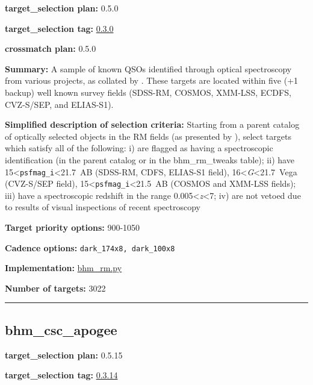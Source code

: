 \noindent\textbf{target\_selection plan:} 0.5.0

\noindent\textbf{target\_selection tag:}
\href{https://github.com/sdss/target_selection/tree/0.3.0/}{0.3.0}

\noindent\textbf{crossmatch plan:} 0.5.0

\noindent\textbf{Summary:} A sample of known QSOs identified through optical
spectroscopy from various projects, as collated by
\citet{Yang2022}. These targets are located within five (+1 backup) well
known survey fields (SDSS-RM, COSMOS, XMM-LSS, ECDFS, CVZ-S/SEP, and
ELIAS-S1).

\noindent\textbf{Simplified description of selection criteria:} Starting from a
parent catalog of optically selected objects in the RM fields (as
presented by
\citealt{Yang2022}), select targets which satisfy all of the following: i)
are flagged as having a spectroscopic identification (in the parent
catalog or in the bhm\_rm\_tweaks table); ii) have
15\textless{}\texttt{psfmag\_i}\textless21.7~AB (SDSS-RM, CDFS, ELIAS-S1
field), 16\textless{}\emph{G}\textless21.7~Vega (CVZ-S/SEP field),
15\textless{}\texttt{psfmag\_i}\textless21.5~AB (COSMOS and XMM-LSS
fields); iii) have a spectroscopic redshift in the range
0.005\textless{}\emph{z}\textless7; iv) are not vetoed due to results of
visual inspections of recent spectroscopy


\noindent\textbf{Target priority options:} 900-1050

\noindent\textbf{Cadence options:} \texttt{dark\_174x8,\ dark\_100x8}

\noindent\textbf{Implementation:}
\href{https://github.com/sdss/target_selection/blob/0.3.0/python/target_selection/cartons/bhm_rm.py}{bhm\_rm.py}

\noindent\textbf{Number of targets:} 3022

\begin{center}\rule{0.5\linewidth}{0.5pt}\end{center}

\hypertarget{bhm_csc_apogee_plan0.5.15}{%
\subsection{bhm\_csc\_apogee}\label{bhm_csc_apogee_plan0.5.15}}

\noindent\textbf{target\_selection plan:} 0.5.15

\noindent\textbf{target\_selection tag:}
\href{https://github.com/sdss/target_selection/tree/0.3.14/}{0.3.14}


